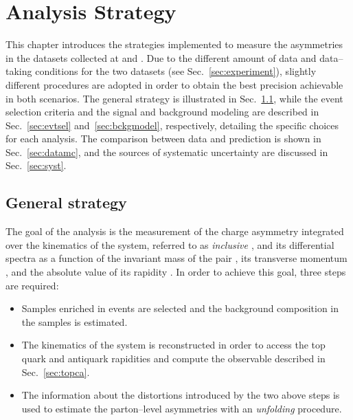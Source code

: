 \chapter{Analysis Strategy}
\label{sec:strategy}

This chapter introduces the strategies implemented to measure the
asymmetries in the datasets collected at \seventev{} and \eighttev{}.
Due to the different amount of data and data--taking conditions for
the two datasets (see Sec.~\ref{sec:experiment}), slightly different
procedures are adopted in order to obtain the best precision
achievable in both scenarios. The general strategy is illustrated in
Sec.~\ref{sec:genstrategy}, while the event
selection criteria and the signal and background modeling are
described in Sec.~\ref{sec:evtsel} and~\ref{sec:bckgmodel},
respectively, detailing the specific choices for each analysis. The
comparison between data and prediction is shown in
Sec.~\ref{sec:datamc}, and the sources of systematic uncertainty are
discussed in Sec.~\ref{sec:syst}.

\section{General strategy}
\label{sec:genstrategy}

The goal of the analysis is the measurement of the charge asymmetry
\ac{} integrated over the kinematics of the \ttbar{} system,
referred to as {\it inclusive \ac{}}, and its differential spectra as
a function of the invariant mass of the \ttbar{} pair \mtt{}, its
transverse momentum \pttt{}, and the absolute value of its rapidity
\ytt{}. In order to achieve this goal, three steps are required:
\begin{itemize}
\item Samples enriched in \ttbar{} events are selected and the
  background composition in the samples is estimated.
\item The kinematics of the \ttbar{} system is reconstructed in order
  to access the top quark and antiquark rapidities and compute the
  \dy{} observable described in Sec.~\ref{sec:topca}.
\item The information about the distortions introduced by the two
  above steps is used to estimate the parton--level asymmetries with
  an {\it unfolding} procedure.
\end{itemize}

